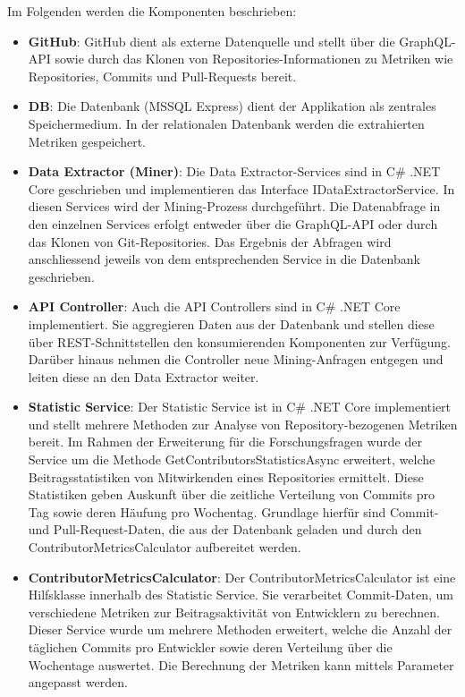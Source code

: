 Im Folgenden werden die Komponenten beschrieben:
\begin{itemize}
    \item \textbf{GitHub}: GitHub dient als externe Datenquelle und stellt über die GraphQL-API sowie durch das Klonen von Repositories-Informationen zu Metriken wie Repositories, Commits und Pull-Requests bereit.
    \item \textbf{DB}: Die Datenbank (MSSQL Express) dient der Applikation als zentrales Speichermedium. In der relationalen Datenbank werden die extrahierten Metriken gespeichert. 
    \item \textbf{Data Extractor (Miner)}: Die Data Extractor-Services sind in C\# .NET Core geschrieben und implementieren das Interface IDataExtractorService. In diesen Services wird der Mining-Prozess durchgeführt. Die Datenabfrage in den einzelnen Services erfolgt entweder über die GraphQL-API oder durch das Klonen von Git-Repositories. Das Ergebnis der Abfragen wird anschliessend jeweils von dem entsprechenden Service in die Datenbank geschrieben. 
    \item \textbf{API Controller}: Auch die API Controllers sind in C\# .NET Core implementiert. Sie aggregieren Daten aus der Datenbank und stellen diese über REST-Schnittstellen den konsumierenden Komponenten zur Verfügung. Darüber hinaus nehmen die Controller neue Mining-Anfragen entgegen und leiten diese an den Data Extractor weiter.
    \item \textbf{Statistic Service}: Der Statistic Service ist in C\# .NET Core implementiert und stellt mehrere Methoden zur Analyse von Repository-bezogenen Metriken bereit. Im Rahmen der Erweiterung für die Forschungsfragen wurde der Service um die Methode GetContributorsStatisticsAsync erweitert, welche Beitragsstatistiken von Mitwirkenden eines Repositories ermittelt. Diese Statistiken geben Auskunft über die zeitliche Verteilung von Commits pro Tag sowie deren Häufung pro Wochentag. Grundlage hierfür sind Commit- und Pull-Request-Daten, die aus der Datenbank geladen und durch den ContributorMetricsCalculator aufbereitet werden.
    \item \textbf{ContributorMetricsCalculator}: Der ContributorMetricsCalculator ist eine \linebreak Hilfsklasse innerhalb des Statistic Service. Sie verarbeitet Commit-Daten, um verschiedene Metriken zur Beitragsaktivität von Entwicklern zu berechnen. Dieser Service wurde um mehrere Methoden erweitert, welche die Anzahl der täglichen Commits pro Entwickler sowie deren Verteilung über die Wochentage auswertet. Die Berechnung der Metriken kann mittels Parameter angepasst werden. 

\end{itemize}
